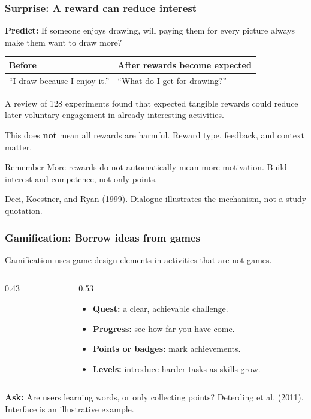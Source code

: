 \documentclass{beamer}
\begin{document}
\begin{frame}
\frametitle{Surprise: A reward can reduce interest}
\small
\textbf{Predict:} If someone enjoys drawing, will paying them for every picture always make them want to draw more?
\medskip
\renewcommand{\arraystretch}{1.35}
\begin{tabular}{@{}p{4.8cm}p{4.8cm}@{}}
\toprule
\textbf{Before} & \textbf{After rewards become expected}\\
\midrule
``I draw because I enjoy it.'' & ``What do I get for drawing?''\\
\bottomrule
\end{tabular}
\medskip

A review of 128 experiments found that expected tangible rewards could reduce later voluntary engagement in already interesting activities.
\medskip

This does \textbf{not} mean all rewards are harmful. Reward type, feedback, and context matter.
\begin{block}{Remember}
More rewards do not automatically mean more motivation. Build interest and competence, not only points.
\end{block}
{\tiny Deci, Koestner, and Ryan (1999). Dialogue illustrates the mechanism, not a study quotation.}
\end{frame}

\begin{frame}
\frametitle{Gamification: Borrow ideas from games}
\small
Gamification uses game-design elements in activities that are not games.
\medskip
\begin{columns}[c]
\begin{column}{0.43\textwidth}
\centering
{}
\end{column}
\begin{column}{0.53\textwidth}
\begin{itemize}
\item \textbf{Quest:} a clear, achievable challenge.
\item \textbf{Progress:} see how far you have come.
\item \textbf{Points or badges:} mark achievements.
\item \textbf{Levels:} introduce harder tasks as skills grow.
\end{itemize}
\end{column}
\end{columns}
\medskip
\textbf{Ask:} Are users learning words, or only collecting points?
\vfill
{\tiny Deterding et al. (2011). Interface is an illustrative example.}
\end{frame}
\end{document}

